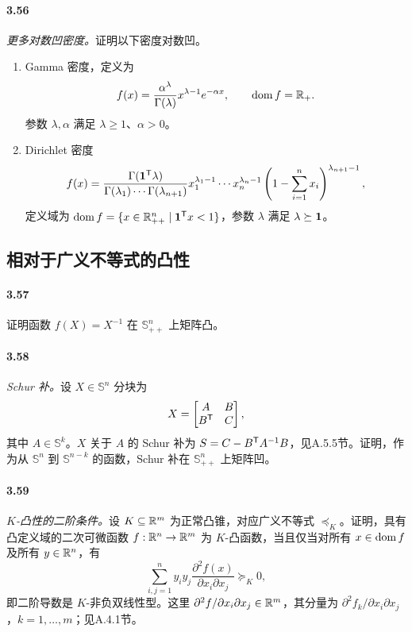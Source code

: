 \paragraph{3.56}\textit{更多对数凹密度。}证明以下密度对数凹。
\begin{enumerate}[label=(\alph*)]
\item [MO79，第493页] Gamma 密度，定义为
\[f(x)=\frac{\alpha^\lambda}{\Gamma(\lambda)}x^{\lambda-1}e^{-\alpha x},\qquad\operatorname{dom} f=\mathbb R_+.\]
参数 $\lambda,\alpha$ 满足 $\lambda\geq1$、$\alpha>0$。
\item [MO79，第306页] Dirichlet 密度
\[
 f(x)=\frac{\Gamma(\mathbf 1^\mathsf T\lambda)}{\Gamma(\lambda_1)\cdots\Gamma(\lambda_{n+1})}
 x_1^{\lambda_1-1}\cdots x_n^{\lambda_n-1}
 \left(1-\sum_{i=1}^n x_i\right)^{\lambda_{n+1}-1},
\]
定义域为 $\operatorname{dom} f=\{x\in\mathbb R_{++}^n\mid\mathbf 1^\mathsf T x<1\}$，参数 $\lambda$ 满足 $\lambda\succeq\mathbf 1$。
\end{enumerate}
\subsection*{相对于广义不等式的凸性}
\paragraph{3.57}证明函数 $f(X)=X^{-1}$ 在 $\mathbb S_{++}^n$ 上矩阵凸。
\paragraph{3.58}\textit{Schur 补。}设 $X\in\mathbb S^n$ 分块为
\[X=\begin{bmatrix}A&B\\B^\mathsf T&C\end{bmatrix},\]
其中 $A\in\mathbb S^k$。$X$ 关于 $A$ 的 Schur 补为 $S=C-B^\mathsf T A^{-1}B$，见A.5.5节。证明，作为从 $\mathbb S^n$ 到 $\mathbb S^{n-k}$ 的函数，Schur 补在 $\mathbb S_{++}^n$ 上矩阵凹。
\paragraph{3.59}\textit{$K$-凸性的二阶条件。}设 $K\subseteq\mathbb R^m$ 为正常凸锥，对应广义不等式 $\preceq_K$。证明，具有凸定义域的二次可微函数 $f:\mathbb R^n\to\mathbb R^m$ 为 $K$-凸函数，当且仅当对所有 $x\in\operatorname{dom} f$ 及所有 $y\in\mathbb R^n$，有
\[\sum_{i,j=1}^n y_iy_j\frac{\partial^2f(x)}{\partial x_i\partial x_j}\succeq_K0,\]
即二阶导数是 $K$-非负双线性型。这里 $\partial^2f/\partial x_i\partial x_j\in\mathbb R^m$，其分量为 $\partial^2f_k/\partial x_i\partial x_j$，$k=1,\ldots,m$；见A.4.1节。
